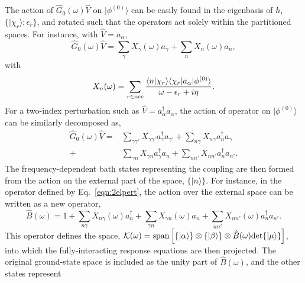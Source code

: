 \documentclass[aps,showpacs,twocolumn,nobibnotes]{revtex4}
\begin{document}
The action of ${\hat G_0}(\omega){\hat V}$ on $|\phi^{(0)} \rangle$ can be easily found in the eigenbasis of $h$, $\{ |\chi_r \rangle ; \epsilon_r \}$, 
and rotated such that the operators act solely within the partitioned spaces. For instance, with ${\hat V}=a_{\alpha}$, 
\begin{equation}
    {\hat G_0}(\omega){\hat V} = \sum_{\gamma} X_{\gamma}(\omega) a_{\gamma} + \sum_{n} X_{n}(\omega) a_n  ,
\end{equation}
with
\begin{equation}
    X_n(\omega) = \sum_{r \in \text{\textnormal {occ}}} \frac{\langle n|\chi_r \rangle \langle \chi_r | a_{\alpha} | \phi^{(0)} \rangle}{\omega - \epsilon_r + i \eta}   .
\end{equation}
For a two-index perturbation such as ${\hat V}=a_{\alpha}^{\dagger}a_{\alpha}$, the action of operator on $|\phi^{(0)} \rangle$ can be similarly decomposed as,
\begin{align}
    {\hat G_0}(\omega){\hat V} =& \sum_{\gamma \gamma'} X_{\gamma \gamma'} a_{\gamma}^{\dagger} a_{\gamma'} + \sum_{n \gamma} X_{n \gamma} a_n^{\dagger} a_{\gamma} \nonumber\\ 
                               +& \sum_{\gamma n} X_{\gamma n} a_{\gamma}^{\dagger} a_{n}  + \sum_{n n'} X_{n n'} a_n^{\dagger} a_{n'}    .   \label{eqn:2elpert}
\end{align}
The frequency-dependent bath states representing the coupling are then formed from the action on the external part of the space, $\{| n \rangle \}$. For instance, in the 
operator defined by Eq.~\ref{eqn:2elpert}, the action over the external space can be written as a new operator,
\begin{equation}
    {\hat B}(\omega) = 1 + \sum_{n \gamma} X_{n \gamma}(\omega) a_n^{\dagger} + \sum_{\gamma n} X_{\gamma n}(\omega) a_{n} + \sum_{n n'} X_{n n'}(\omega) a_n^{\dagger} a_{n'} .   \label{eqn:B}
\end{equation}
This operator defines the space, \mbox{$\mathcal{K}(\omega)=\text{\textnormal {span}} \left[ \{|\alpha \rangle \} \otimes \{ |\beta \rangle \} \otimes {\hat B}(\omega) \text{\textnormal {det}} \{ | \mu \rangle \} \right]$}, into which the fully-interacting 
response equations are then projected. The original ground-state space is included as the unity part of ${\hat B}(\omega)$, and the other states represent 
\end{document}
